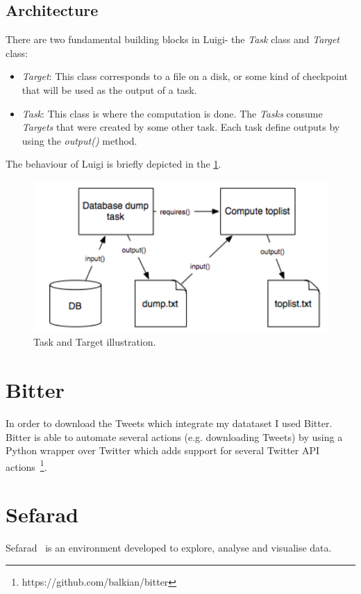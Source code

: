 \subsection{Architecture}
There are two fundamental building blocks in Luigi- the \textit{Task} class and \textit{Target} class:
\begin{itemize}
    \item \textit{Target}: This class corresponds to a file on a disk, or some kind of checkpoint that will be used as the output of a task.
    \item \textit{Task}: This class is where the computation is done. The \textit{Tasks} consume \textit{Targets} that were created by some other task. Each task define outputs by using the \textit{output()} method. 
\end{itemize}
The behaviour of Luigi is briefly depicted in the \cref{fig:luigytask}.
\begin{figure}
  \includegraphics[width=\linewidth]{img/luigi_tasks.png}
  \caption{Task and Target illustration.~\cite{luigi}}
  \label{fig:luigytask}
\end{figure}
\section{Bitter}
In order to download the Tweets which integrate my datataset I used Bitter. Bitter is able to automate several actions (e.g. downloading Tweets) by using a Python wrapper over Twitter which adds support for several Twitter API actions~\footnote{https://github.com/balkian/bitter}.
\section{Sefarad}
Sefarad~\cite{sefarad} is an environment developed to explore, analyse and visualise data. 
